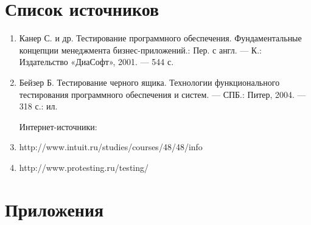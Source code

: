 \documentclass[a4paper,12pt]{article}
\begin{document}
\newpage\section*{Список источников}

\begin{enumerate}
\item Канер С.  и др. Тестирование  программного  обеспечения.  Фундаментальные  концепции  
менеджмента бизнес-приложений.:  Пер.  с англ.  —  К.:  Издательство  «ДиаСофт»,  2001.  —  544  с.  
\item Бейзер Б. Тестирование черного ящика. Технологии функционального тестирования программного обеспечения и систем.  —  СПБ.: Питер, 2004.  —  318 с.: ил.
\par Интернет-источники:
\item http://www.intuit.ru/studies/courses/48/48/info
\item http://www.protesting.ru/testing/
\end{enumerate}


\newpage\section*{Приложения}
\end{document}
